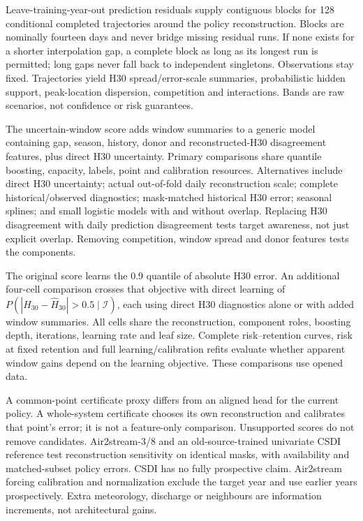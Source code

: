 Leave-training-year-out prediction residuals supply contiguous blocks for 128 conditional completed trajectories around the policy reconstruction. Blocks are nominally fourteen days and never bridge missing residual runs. If none exists for a shorter interpolation gap, a complete block as long as its longest run is permitted; long gaps never fall back to independent singletons. Observations stay fixed. Trajectories yield H30 spread/error-scale summaries, probabilistic hidden support, peak-location dispersion, competition and interactions. Bands are raw scenarios, not confidence or risk guarantees.

The uncertain-window score adds window summaries to a generic model containing gap, season, history, donor and reconstructed-H30 disagreement features, plus direct H30 uncertainty. Primary comparisons share quantile boosting, capacity, labels, point and calibration resources. Alternatives include direct H30 uncertainty; actual out-of-fold daily reconstruction scale; complete historical/observed diagnostics; mask-matched historical H30 error; seasonal splines; and small logistic models with and without overlap. Replacing H30 disagreement with daily prediction disagreement tests target awareness, not just explicit overlap. Removing competition, window spread and donor features tests the components.

The original score learns the 0.9 quantile of absolute H30 error. An additional four-cell comparison crosses that objective with direct learning of $P(|H_{30}-\widehat H_{30}|>0.5\mid\mathcal I)$, each using direct H30 diagnostics alone or with added window summaries. All cells share the reconstruction, component roles, boosting depth, iterations, learning rate and leaf size. Complete risk--retention curves, risk at fixed retention and full learning/calibration refits evaluate whether apparent window gains depend on the learning objective. These comparisons use opened data.

A common-point certificate proxy differs from an aligned head for the current policy. A whole-system certificate chooses its own reconstruction and calibrates that point's error; it is not a feature-only comparison. Unsupported scores do not remove candidates. Air2stream-3/8 \cite{piccolroaz2016} and an old-source-trained univariate CSDI reference \cite{tashiro2021} test reconstruction sensitivity on identical masks, with availability and matched-subset policy errors. CSDI has no fully prospective claim. Air2stream forcing calibration and normalization exclude the target year and use earlier years prospectively. Extra meteorology, discharge or neighbours are information increments, not architectural gains.

